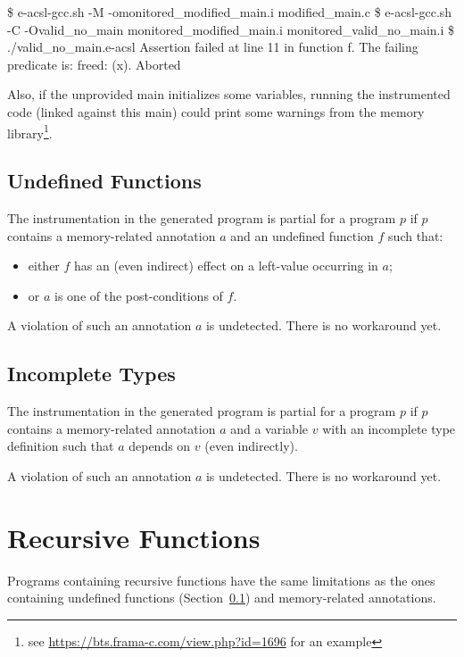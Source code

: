\begin{shell}
\$ e-acsl-gcc.sh -M -omonitored_modified_main.i modified_main.c
\$ e-acsl-gcc.sh -C -Ovalid_no_main monitored_modified_main.i monitored_valid_no_main.i
\$ ./valid_no_main.e-acsl
Assertion failed at line 11 in function f.
The failing predicate is:
freed: \valid(x).
Aborted
\end{shell}

Also, if the unprovided main initializes some variables, running the
instrumented code (linked against this main) could print some warnings from the
\eacsl memory library\footnote{see
  \url{https://bts.frama-c.com/view.php?id=1696} for an example}.

\subsection{Undefined Functions}
\label{sec:limits:no-code}

The instrumentation in the generated program is partial for a program $p$ if $p$
contains a memory-related annotation $a$ and an undefined function
$f$ such that:
\begin{itemize}
\item either $f$ has an (even indirect) effect on a left-value occurring in $a$;
\item or $a$ is one of the post-conditions of $f$.
\end{itemize}
A violation of such an annotation $a$ is undetected. There is no workaround yet.

\subsection{Incomplete Types}

The instrumentation in the generated program is partial for a program $p$ if $p$
contains a memory-related annotation $a$ and a variable $v$ with an incomplete
type definition such that $a$ depends on $v$ (even indirectly).

A violation of such an annotation $a$ is undetected. There is no workaround yet.

\section{Recursive Functions}

Programs containing recursive functions have the same limitations as the ones
containing undefined functions (Section~\ref{sec:limits:no-code}) and
memory-related annotations.

